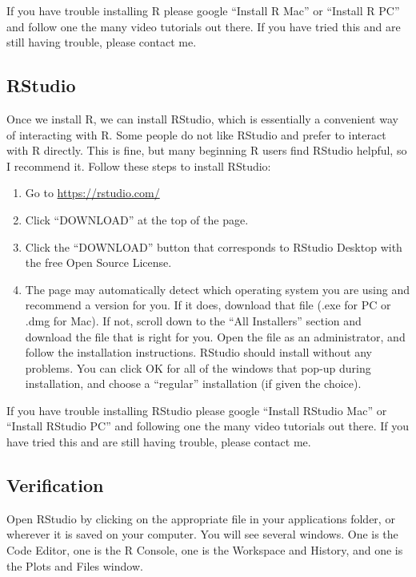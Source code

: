 \documentclass[
]{krantz}
\begin{document}
If you have trouble installing R please google ``Install R Mac'' or ``Install R PC'' and follow one the many video tutorials out there. If you have tried this and are still having trouble, please contact me.

\hypertarget{rstudio}{%
\subsection{RStudio}\label{rstudio}}

Once we install R, we can install RStudio, which is essentially a convenient way of interacting with R. Some people do not like RStudio and prefer to interact with R directly. This is fine, but many beginning R users find RStudio helpful, so I recommend it. Follow these steps to install RStudio:

\begin{enumerate}
\def\labelenumi{\arabic{enumi}.}
\item
  Go to \url{https://rstudio.com/}
\item
  Click ``DOWNLOAD'' at the top of the page.
\item
  Click the ``DOWNLOAD'' button that corresponds to RStudio Desktop with the free Open Source License.
\item
  The page may automatically detect which operating system you are using and recommend a version for you. If it does, download that file (.exe for PC or .dmg for Mac). If not, scroll down to the ``All Installers'' section and download the file that is right for you. Open the file as an administrator, and follow the installation instructions. RStudio should install without any problems. You can click OK for all of the windows that pop-up during installation, and choose a ``regular'' installation (if given the choice).
\end{enumerate}

If you have trouble installing RStudio please google ``Install RStudio Mac'' or ``Install RStudio PC'' and following one the many video tutorials out there. If you have tried this and are still having trouble, please contact me.

\hypertarget{verification}{%
\subsection{Verification}\label{verification}}

Open RStudio by clicking on the appropriate file in your applications folder, or wherever it is saved on your computer. You will see several windows. One is the Code Editor, one is the R Console, one is the Workspace and History, and one is the Plots and Files window.
\end{document}
